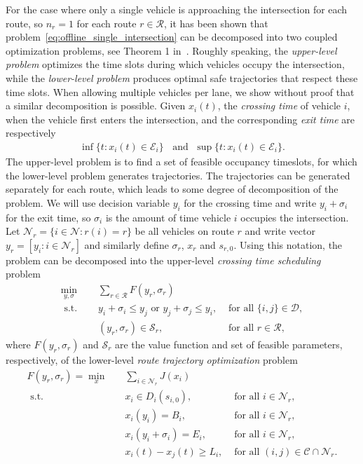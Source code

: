 \documentclass[a4paper]{article}
\theoremstyle{definition}
\theoremstyle{plain}
\begin{document}
For the case where only a single vehicle is approaching the intersection for
each route, so $n_{r} = 1$ for each route $r \in \mathcal{R}$, it has been shown
that problem~\eqref{eq:offline_single_intersection} can be decomposed into two coupled optimization problems, see
Theorem 1 in~\cite{hultApproximateSolutionOptimal2015}. Roughly speaking, the \textit{upper-level problem} optimizes the time
slots during which vehicles occupy the intersection, while the \textit{lower-level problem}
produces optimal safe trajectories that respect these time slots.
%
When allowing multiple vehicles per lane, we show without proof that a similar
decomposition is possible.
%
Given $x_{i}(t)$, the \textit{crossing time} of vehicle $i$, when the vehicle
first enters the intersection, and the corresponding \textit{exit time} are respectively
\begin{align*}
  \inf \{ t: x_{i}(t) \in \mathcal{E}_{i} \}  \;\; \text{ and } \; \sup \{ t: x_{i}(t) \in \mathcal{E}_{i} \} .
\end{align*}
%
The upper-level problem is to find a set of feasible occupancy timeslots, for
which the lower-level problem generates trajectories. The trajectories can be
generated separately for each route, which leads to some degree of decomposition
of the problem.
%
We will use decision variable $y_{i}$ for the crossing time and write
$y_{i} + \sigma_{i}$ for the exit time, so $\sigma_{i}$ is the amount of time vehicle
$i$ occupies the intersection. Let
$\mathcal{N}_{r} = \{ i \in \mathcal{N} : r(i) = r\}$ be all vehicles on route
$r$ and write vector $y_{r} = [ y_{i} : i \in \mathcal{N}_{r} ]$ and similarly
define ${\sigma}_{r}$, ${x}_{r}$ and ${s}_{r,0}$.
%
Using this notation, the problem can be decomposed into the upper-level
\textit{crossing time scheduling} problem
%
\begin{align*}
  \min_{{y}, {\sigma}} \quad & \sum_{r \in \mathcal{R}} F({y}_{r}, {\sigma}_{r}) \\
  \text{ s.t. } \quad & y_i + \sigma_i \leq y_j \text{ or } y_j + \sigma_j \leq y_i, & \text{ for all } \{i, j\} \in \mathcal{D} , \\
  & ({y}_{r}, {\sigma}_{r}) \in \mathcal{S}_{r} , & \text{ for all } r \in \mathcal{R} ,
\end{align*}
where $F({y}_{r}, {\sigma}_{r})$ and $\mathcal{S}_{r}$ are the value function and set of
feasible parameters, respectively, of the lower-level \textit{route trajectory optimization}
problem
\begin{align*}
  F({y}_{r}, {\sigma}_{r}) = \min_{{x}} \quad & \sum_{i \in \mathcal{N}_{r}} J(x_{i}) \\
  \text{ s.t. } \quad & x_{i} \in D_{i}(s_{i,0}) , & \text{ for all } i \in \mathcal{N}_{r} , \\
  & x_{i}(y_i) = B_{i} , & \text{ for all } i \in \mathcal{N}_{r} , \\
  & x_{i}(y_i + \sigma_i) = E_{i} , & \text{ for all } i \in \mathcal{N}_{r} , \\
  & x_{i}(t) - x_{j}(t) \geq L_{i} , & \text{ for all } (i, j) \in \mathcal{C} \cap \mathcal{N}_{r} .
\end{align*}
\end{document}
